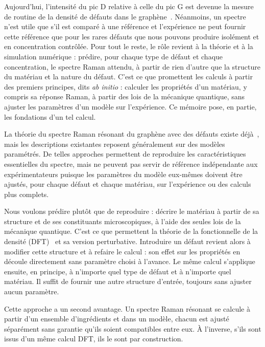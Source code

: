 Aujourd'hui, l'intensité du pic D relative à celle du pic G est devenue la mesure de routine de la densité de défauts dans le graphène~\cite{luccheseQuantifyingIoninducedDefects2010,martinsferreiraEvolutionRamanSpectra2010}. Néanmoins, un spectre n'est utile que s'il est comparé à une référence et l'expérience ne peut fournir cette référence que pour les rares défauts que nous pouvons produire isolément et en concentration contrôlée. Pour tout le reste, le rôle revient à la théorie et à la simulation numérique : prédire, pour chaque type de défaut et chaque concentration, le spectre Raman attendu, à partir de rien d'autre que la structure du matériau et la nature du défaut. C'est ce que promettent les calculs à partir des premiers principes, dits \textit{ab initio} : calculer les propriétés d'un matériau, y compris sa réponse Raman, à partir des lois de la mécanique quantique, sans ajuster les paramètres d'un modèle sur l'expérience. Ce mémoire pose, en partie, les fondations d'un tel calcul.

\newpage
{}

La théorie du spectre Raman résonant du graphène avec des défauts existe déjà~\cite{venezuelaTheoryDoubleresonantRaman2011}, mais les descriptions existantes reposent généralement sur des modèles paramétrés. De telles approches permettent de reproduire les caractéristiques essentielles du spectre, mais ne peuvent pas servir de référence indépendante aux expérimentateurs puisque les paramètres du modèle eux-mêmes doivent être ajustés, pour chaque défaut et chaque matériau, sur l'expérience ou des calculs plus complets.

Nous voulons prédire plutôt que de reproduire : décrire le matériau à partir de sa structure et de ses constituants microscopiques, à l'aide des seules lois de la mécanique quantique. C'est ce que permettent la théorie de la fonctionnelle de la densité (DFT)~\cite{hohenbergInhomogeneousElectronGas1964,kohnSelfConsistentEquationsIncluding1965} et sa version perturbative. Introduire un défaut revient alors à modifier cette structure et à refaire le calcul : son effet sur les propriétés en découle directement sans paramètre choisi à l'avance. Le même calcul s'applique ensuite, en principe, à n'importe quel type de défaut et à n'importe quel matériau. Il suffit de fournir une autre structure d'entrée, toujours sans ajuster aucun paramètre.

Cette approche a un second avantage. Un spectre Raman résonant se calcule à partir d'un ensemble d'ingrédients et dans un modèle, chacun est ajusté séparément sans garantie qu'ils soient compatibles entre eux. À l'inverse, s'ils sont issus d'un même calcul DFT, ils le sont par construction.

